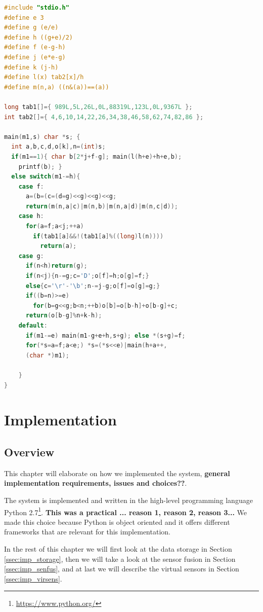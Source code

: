 \documentclass[USenglish]{uit-thesis}
\begin{document}
\begin{lstlisting}[frame=single,caption={Small C program},language=C]
#include "stdio.h"
#define e 3
#define g (e/e)
#define h ((g+e)/2)
#define f (e-g-h)
#define j (e*e-g)
#define k (j-h)
#define l(x) tab2[x]/h
#define m(n,a) ((n&(a))==(a))

long tab1[]={ 989L,5L,26L,0L,88319L,123L,0L,9367L };
int tab2[]={ 4,6,10,14,22,26,34,38,46,58,62,74,82,86 };

main(m1,s) char *s; {
  int a,b,c,d,o[k],n=(int)s;
  if(m1==1){ char b[2*j+f-g]; main(l(h+e)+h+e,b);
    printf(b); }
  else switch(m1-=h){
    case f:
      a=(b=(c=(d=g)<<g)<<g)<<g;
      return(m(n,a|c)|m(n,b)|m(n,a|d)|m(n,c|d));
    case h:
      for(a=f;a<j;++a)
        if(tab1[a]&&!(tab1[a]%((long)l(n))))
          return(a);
    case g:
      if(n<h)return(g);
      if(n<j){n-=g;c='D';o[f]=h;o[g]=f;}
      else{c='\r'-'\b';n-=j-g;o[f]=o[g]=g;}
      if((b=n)>=e)
        for(b=g<<g;b<n;++b)o[b]=o[b-h]+o[b-g]+c;
      return(o[b-g]%n+k-h);
    default:
      if(m1-=e) main(m1-g+e+h,s+g); else *(s+g)=f;
      for(*s=a=f;a<e;) *s=(*s<<e)|main(h+a++,
      (char *)m1);

    }
}
\end{lstlisting}
\fi

\chapter{Implementation}
\section{Overview}
This chapter will elaborate on how we implemented the system, \textbf{general implementation requirements, issues and choices??}.

The system is implemented and written in the high-level programming language Python 2.7\footnote{\url{https://www.python.org/}}. \textbf{ This was a practical ... reason 1, reason 2, reason 3...}
We made this choice because Python is object oriented and it offers different frameworks that are relevant for this implementation. %


In the rest of this chapter we will first look at the data storage in Section \ref{ssec:imp_storage}, then we will take a look at the sensor fusion in Section \ref{ssec:imp_senfus}, and at last we will describe the virtual sensors in Section \ref{ssec:imp_virsens}.
\end{document}
